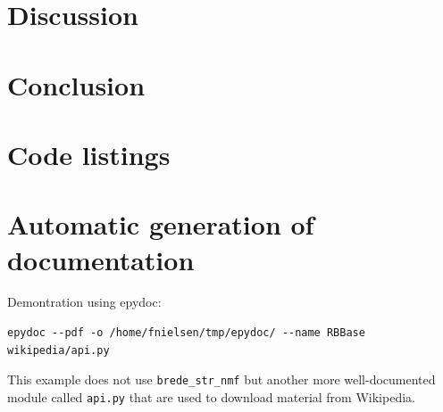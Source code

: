 \documentclass[10pt]{IEEEtran}
\begin{document}
\section{Discussion}


\section{Conclusion}






\clearpage
\onecolumn
\appendices
\section{Code listings}

\lstlistoflistings


\label{listing:brede_str_nmf}


\newpage
\section{Automatic generation of documentation}

Demontration using epydoc:
\begin{verbatim}
epydoc --pdf -o /home/fnielsen/tmp/epydoc/ --name RBBase wikipedia/api.py
\end{verbatim}
This example does not use \verb!brede_str_nmf! but another more
well-documented module called {\tt api.py} that are used to download
material from Wikipedia. 


\end{document}
